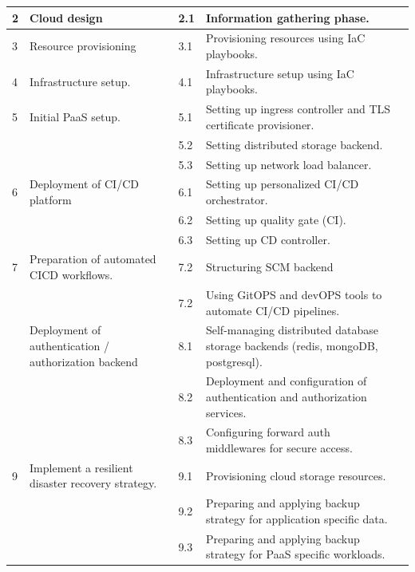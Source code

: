 \begin{longtable}[!ht]{|m{1cm}|m{3cm}|m{1cm}|m{7cm}|m{1.2cm}|}
\hline
2 & Cloud design &	2.1 &	Information gathering phase. & \\
\hline
3 & Resource provisioning &	3.1 &	Provisioning resources using IaC playbooks. & \\
\hline
4 & Infrastructure setup. &	4.1 &	Infrastructure setup using IaC playbooks. & \\
\hline
5 & \raggedright Initial PaaS setup. &	5.1 &	Setting up ingress controller and TLS certificate provisioner.	 & \\
\cline{3-5}
&   & 5.2 &	Setting distributed storage backend.	 & \\
\cline{3-5}
&   & 5.3 &	Setting up network load balancer.	 & \\
  \hline
6 & Deployment of CI/CD platform &	6.1 &	Setting up personalized CI/CD orchestrator.	 & \\
\cline{3-5}
&   & 6.2 &	Setting up quality gate (CI).	 & \\
\cline{3-5}
&   & 6.3 & Setting up CD controller.	 & \\
  \hline
7 & \raggedright Preparation of automated CICD workflows. &	7.2 &	Structuring SCM backend	 & \\
\cline{3-5}
&   & 7.2 &	 \raggedright Using GitOPS and devOPS tools to automate CI/CD pipelines.	 & \\
   \hline
   \newpage
     \hline
8 & \raggedright Deployment of authentication / authorization backend 	& 8.1 & \raggedright Self-managing distributed database storage backends (redis, mongoDB, postgresql).	 & \\
\cline{3-5}
&   & 8.2 &	\raggedright Deployment and configuration of authentication and authorization services.	 & \\
\cline{3-5}
&   & 8.3 &	\raggedright Configuring forward auth middlewares for secure access.	 & \\
   \hline
9 & \raggedright Implement a resilient disaster recovery strategy. & 9.1 &\raggedright  Provisioning cloud storage resources.		 & \\
\cline{3-5}
&   & 9.2 & \raggedright Preparing and applying backup strategy for application specific data.	 & \\
\cline{3-5}
&   & 9.3 &	\raggedright Preparing and applying backup strategy for PaaS specific workloads.	 & \\
 \hline

\end{longtable}

